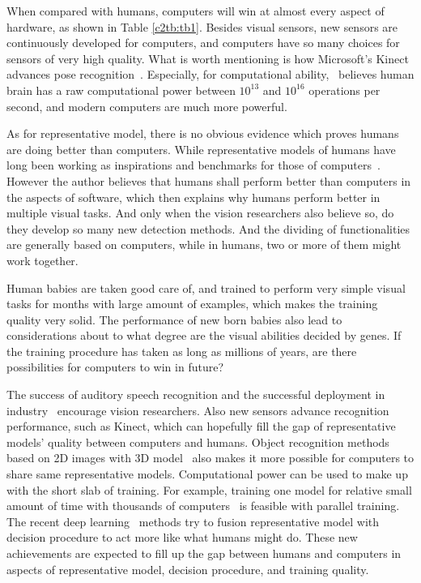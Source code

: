 When compared with humans, computers will win at almost every aspect of hardware, as shown in Table \ref{c2tb:tb1}. Besides visual sensors, new sensors are continuously developed for computers, and computers have so many choices for sensors of very high quality. What is worth mentioning is how Microsoft's Kinect advances pose recognition~\citep{knct}. Especially, for computational ability,~\citep{bpw} believes human brain has a raw computational power between $10^{13}$ and $10^{16}$ operations per second, and modern computers are much more powerful.

 As for representative model, there is no obvious evidence which proves humans are doing better than computers. While representative models of humans have long been working as inspirations and benchmarks for those of computers~\citep{rbm}. However the author believes that humans shall perform better than computers in the aspects of software, which then explains why humans perform better in multiple visual tasks. And only when the vision researchers also believe so, do they develop  so many new detection methods. And the  dividing of functionalities  are generally based on computers, while in humans, two or more of them might work together.

Human babies are taken good care of, and trained to perform very simple visual tasks for months with large amount of examples, which makes the training quality very solid. The performance of new born babies also lead to considerations about to what degree are the visual abilities decided by genes. If the training procedure has taken as long as millions of years, are there possibilities for computers to win in future?

The success of auditory speech recognition and the successful deployment in industry~\citep{siri} encourage vision researchers. Also new sensors advance recognition performance, such as Kinect, which can hopefully fill the gap of representative models' quality between computers and humans. Object recognition methods based on 2D images with 3D model~\citep{r3d} also makes it more possible for computers to share same representative models.  Computational power can be used to make up with the short slab of training. For example, training one model for relative small amount of time with thousands of computers~\citep{dnnnn} is feasible with parallel training. The recent deep learning~\citep{dlearn} methods try to fusion representative model with decision procedure to act more like what humans might do. These new achievements are expected to fill up the gap between humans and computers in aspects of representative model, decision procedure, and training quality.



